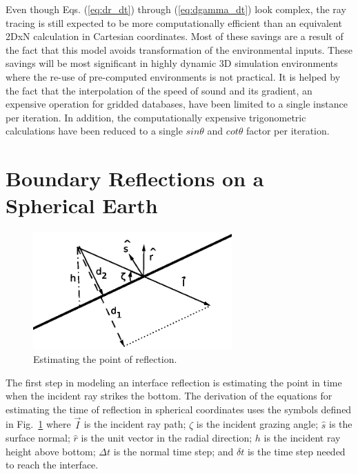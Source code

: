 \documentclass{ws-jca}
\newcommand{\threeD}{3\nobreakdash\textendash D }	%
\newcommand{\twoDxN}{2\nobreakdash\textendash DxN }
\begin{document}
Even though Eqs. (\ref{eq:dr_dt}) through (\ref{eq:dgamma_dt}) look complex, the ray tracing is still expected to be more computationally efficient than
an equivalent \twoDxN calculation in Cartesian coordinates. Most of these savings
are a result of the fact that this model avoids transformation of the
environmental inputs. 
These savings will be most significant in highly dynamic \threeD simulation
environments where the re-use of pre-computed environments is not
practical. It is helped by the fact that the interpolation of
the speed of sound and its gradient, an expensive operation for gridded
databases, have been limited to a single instance per iteration. In
addition, the computationally expensive trigonometric calculations have
been reduced to a single \(sin\theta\) and \(cot\theta\) factor per iteration.

\section{Boundary Reflections on a Spherical Earth}

\begin{figure}[th]
	\centerline{\includegraphics[width=3in]{EstPointCollision.eps}} 
	\vspace*{8pt}
	\caption{Estimating the point of reflection. }
	\label{fig:reflection_time}
\end{figure}

The first step in modeling an interface reflection is estimating the point in time when the incident ray strikes the bottom.  The derivation of the equations for estimating the time of reflection in spherical coordinates uses the symbols defined in Fig.~\ref{fig:reflection_time} where
\(\vec{I}\) is the incident ray path;
\(\zeta\) is the incident grazing angle;
\(\hat{s}\) is the surface normal;
\(\hat{r}\) is the unit vector in the radial direction;
\(h\) is the incident ray height above bottom;
\(\Delta t\) is the normal time step; and
\(\delta t\) is the time step needed to reach the interface.
\end{document}
